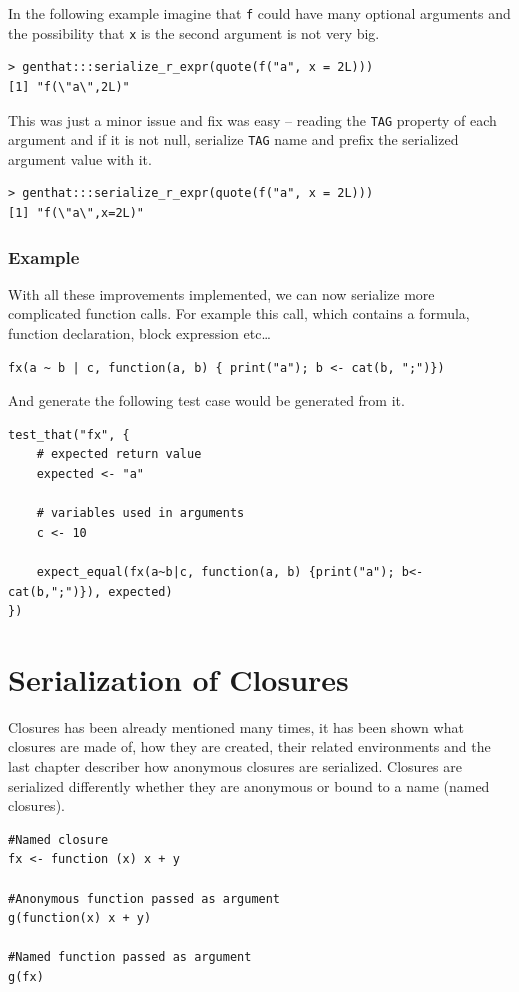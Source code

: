 \documentclass[thesis=B,english]{FITthesis}[2012/10/20]
\begin{document}
In the following example imagine that \verb|f| could have many optional arguments and the possibility that \verb|x| is the second argument is not very big. 


\begin{verbatim}
> genthat:::serialize_r_expr(quote(f("a", x = 2L)))
[1] "f(\"a\",2L)"
\end{verbatim}

This was just a minor issue and fix was easy – reading the \verb|TAG| property of each argument and if it is not null, serialize \verb|TAG| name and prefix the serialized argument value with it.

\begin{verbatim}
> genthat:::serialize_r_expr(quote(f("a", x = 2L)))
[1] "f(\"a\",x=2L)"
\end{verbatim}

\subsection{Example}
With all these improvements implemented, we can now serialize more complicated function calls. For example this call, which contains a formula, function declaration, block expression etc\ldots

\begin{verbatim}
fx(a ~ b | c, function(a, b) { print("a"); b <- cat(b, ";")})
\end{verbatim}

And generate the following test case would be generated from it.
\begin{verbatim}
test_that("fx", {
    # expected return value
    expected <- "a"

    # variables used in arguments
    c <- 10
    
    expect_equal(fx(a~b|c, function(a, b) {print("a"); b<-cat(b,";")}), expected)
})
\end{verbatim}

\chapter{Serialization of Closures}
Closures has been already mentioned many times, it has been shown what closures are made of, how they are created, their related environments and the last chapter describer how anonymous closures are serialized. Closures are serialized differently whether they are anonymous or bound to a name (named closures). 

\begin{verbatim}
#Named closure
fx <- function (x) x + y

#Anonymous function passed as argument
g(function(x) x + y)

#Named function passed as argument
g(fx)

\end{verbatim}
\end{document}
